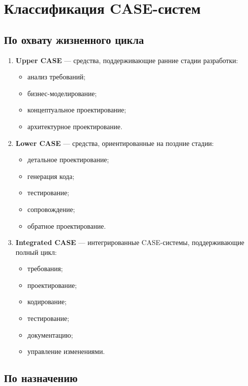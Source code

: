 \documentclass[12pt,a4paper]{article}
\begin{document}
\section{Классификация CASE-систем}

\subsection{По охвату жизненного цикла}

\begin{enumerate}
    \item \textbf{Upper CASE} --- средства, поддерживающие ранние стадии разработки:
    \begin{itemize}
        \item анализ требований;
        \item бизнес-моделирование;
        \item концептуальное проектирование;
        \item архитектурное проектирование.
    \end{itemize}

    \item \textbf{Lower CASE} --- средства, ориентированные на поздние стадии:
    \begin{itemize}
        \item детальное проектирование;
        \item генерация кода;
        \item тестирование;
        \item сопровождение;
        \item обратное проектирование.
    \end{itemize}

    \item \textbf{Integrated CASE} --- интегрированные CASE-системы, поддерживающие полный цикл:
    \begin{itemize}
        \item требования;
        \item проектирование;
        \item кодирование;
        \item тестирование;
        \item документацию;
        \item управление изменениями.
    \end{itemize}
\end{enumerate}

\subsection{По назначению}
\end{document}
